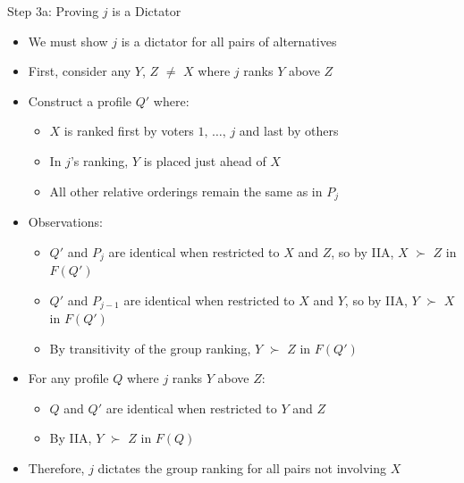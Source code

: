 \documentclass[10pt,handout]{beamer}
\begin{document}
\begin{frame}{Step 3a: Proving $j$ is a Dictator}
  \begin{itemize}[<+->]
    \item We must show $j$ is a dictator for all pairs of alternatives
    \item First, consider any $Y$, $Z$ $\neq$ $X$ where $j$ ranks $Y$ above $Z$
    \item Construct a profile $Q'$ where:
      \begin{itemize}
        \item $X$ is ranked first by voters $1,\,\ldots,\,j$ and last by others
        \item In $j$'s ranking, $Y$ is placed just ahead of $X$
        \item All other relative orderings remain the same as in $P_j$
      \end{itemize}
    \item Observations:
      \begin{itemize}
        \item $Q'$ and $P_j$ are identical when restricted to $X$ and $Z$, so by IIA, $X$ $\succ$ $Z$ in $F(Q')$
        \item $Q'$ and $P_{j-1}$ are identical when restricted to $X$ and $Y$, so by IIA, $Y$ $\succ$ $X$ in $F(Q')$
        \item By transitivity of the group ranking, $Y$ $\succ$ $Z$ in $F(Q')$
      \end{itemize}
    \item For any profile $Q$ where $j$ ranks $Y$ above $Z$:
      \begin{itemize}
        \item $Q$ and $Q'$ are identical when restricted to $Y$ and $Z$
        \item By IIA, $Y$ $\succ$ $Z$ in $F(Q)$
      \end{itemize}
    \item Therefore, $j$ dictates the group ranking for all pairs not involving $X$
  \end{itemize}
\end{frame}
\end{document}
